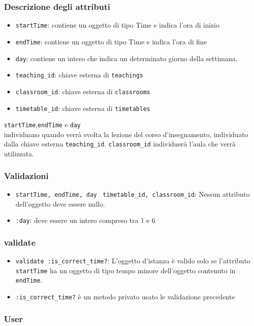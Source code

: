 \documentclass[11pt,a4paper]{article}
\begin{document}
\subsubsection*{Descrizione degli attributi}
\begin{itemize}
 \item \verb|startTime|: contiene un oggetto di tipo Time e indica l'ora di inizio
 \item \verb|endTime|: contiene un oggetto di tipo Time e indica l'ora di fine
 \item \verb|day|: contiene un intero che indica un determinato giorno della settimana.
 \item \verb|teaching_id|: chiave esterna di \verb|teachings|
 \item \verb|classroom_id|: chiave esterna di \verb|classrooms|
 \item \verb|timetable_id|: chiave esterna di \verb|timetables|
\end{itemize}
\verb|startTime|,\verb|endTime| e \verb|day|\\ individuano quando verrà svolta la lezione del corso d'insegnamento, individuato dalla chiave esterna \verb|teaching_id|. \verb|classroom_id| individuerà l'aula che verrà utilizzata.
\subsubsection*{Validazioni}
\begin{itemize}
 \item \verb|startTime, endTime, day | \verb|timetable_id, classroom_id|: Nessun attributo dell'oggetto deve essere nullo.
 \item \verb|:day|: deve essere un intero compreso tra 1 e 6
\end{itemize}
\subsubsection*{validate}
\begin{itemize}
\item \verb|validate :is_correct_time?|: L'oggetto d'istanza è valido solo se l'attributo \verb|startTime| ha un oggetto di tipo tempo minore dell'oggetto contenuto in \verb|endTime|.
\item \verb|:is_correct_time?| è un metodo privato usato le validazione precedente
\end{itemize}
\subsubsection{User}
\end{document}
